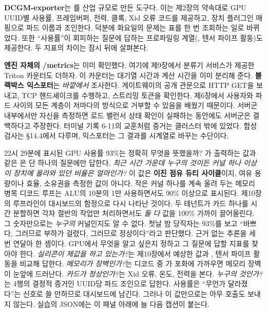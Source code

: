 \textbf{DCGM-exporter}는 를 산업 규모로 만든 도구다. 이는 제2장의 약속대로 GPU UUID별 사용률, 프레임버퍼, 전력, 클록, Xid 오류 코드를 제공하고, 장치 플러그인 매핑으로 파드 이름과 조인한다. 덕분에 화요일의 문제는 표를 한 번 조회하는 일로 바뀌었다. 또한 “사용률”이 회피하는 질문에 답하는 프로파일링 계열(, 텐서 파이프 활동)도 제공한다. 두 지표의 차이는 잠시 뒤에 살펴본다.

\textbf{엔진 자체의 /metrics}는 이미 확인했다. 여기에 제9장에서 분류기 서비스가 제공한 Triton 카운터도 더하자. 이 카운터는 대기열 시간과 계산 시간을 이미 분리해 준다. \textbf{블랙박스 익스포터}는 \textit{바깥에서} 조사한다. 게이트웨이의 공개 관문으로 HTTP GET을 보내고, TCP 핸드셰이크를 수행하고, 스트리밍 토큰을 확인한다. 제6장에서 사용자와 파드 사이의 모든 계층이 저마다의 방식으로 거부할 수 있음을 배웠기 때문이다. 서버군 내부에서만 자신을 측정하면 로드 밸런서 상태 확인이 실패하는 동안에도 서버군은 결백하다고 주장한다. 터미널 기록 6-11의 교훈처럼 증거는 클러스터 밖에 있었다. 합성 검사는 §14.4에서 다루며, 익스포터는 그 결과를 시계열로 바꾸는 수단이다.

22시 29분에 표시된 GPU 사용률 93\%는 정확히 무엇을 뜻했을까? 가 출력하는 값과 같은 은 단 하나의 질문에만 답한다. \textit{최근 시간 가운데 누구의 것이든 커널 하나 이상이 장치에 올라와 있던 비율은 얼마인가?} 이 값은 \textbf{이진 점유 듀티 사이클}이지, 여유 용량이나 효율, 소유권을 측정한 값이 아니다. 작은 커널 하나를 계속 올려 두는 메모리 병목 디코드 루프는 ALU의 10분의 1만 사용하면서도 90\% 이상으로 표시된다. 제10장의 루프라인이 대시보드의 함정으로 다시 나타난 것이다. 두 테넌트가 카드 하나를 시간 분할하면 각자 절반의 작업만 처리하면서도 \textit{둘 다} 값을 100\% 가까이 끌어올린다. 그 숫자만으로는 \textit{누구의} 커널인지도 알 수 없다. 첫날 밤 당직자는 93\%를 보고 “바쁘다, 그러므로 부하가 걸렸다, 그러므로 정상이다”라고 판단했다. 근거 없는 추론을 세 번 연달아 한 셈이다. GPU에서 무엇을 알고 싶은지 정하고 그 질문에 답할 지표를 찾아야 한다. \textit{실리콘이 제값을 하고 있는가?}는 제10장에서 예상한 값과 , 텐서 파이프 활동을 비교해 답한다. \textit{메모리가 장벽인가?}는 디코드 중 가 포화에 가까우면 메모리 장벽이 눈앞에 드러난다. \textit{카드가 정상인가?}는 Xid 오류, 온도, 전력을 본다. \textit{누구의 것인가?}는 4행의 결정적 증거인 UUID당 파드 조인으로 답한다. 사용률은 “무언가 달라졌다”는 신호로 쓸 만하므로 대시보드에 남긴다. 그러나 이 값만으로는 아무 호출도 보내지 않는다. 실습의 JSON에는 이 패널 아래에 늘 다음 캡션이 붙는다. 

